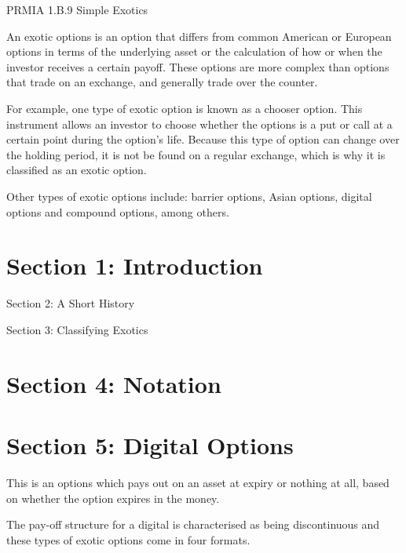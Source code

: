 PRMIA 1.B.9 Simple Exotics 

An exotic options is an option that differs from common American or European options in terms of the underlying asset or the calculation of how or when the investor receives a certain payoff. These options are more complex than options that trade on an exchange, and generally trade over the counter.

For example, one type of exotic option is known as a chooser option. This instrument allows an investor to choose whether the options is a put or call at a certain point during the option's life. Because this type of option can change over the holding period, it is not be found on a regular exchange, which is why it is classified as an exotic option.

Other types of exotic options include: barrier options, Asian options, digital options and compound options, among others.
\section{Section 1: Introduction}

Section 2: A Short History

Section 3: Classifying Exotics


\section{Section 4: Notation}


\section{Section 5: Digital Options}

This is an options which pays out on an asset at expiry or nothing at all, based on whether 
the option expires in the money.

The pay-off structure for a digital is characterised as being discontinuous and these types of exotic options come in four formats.

